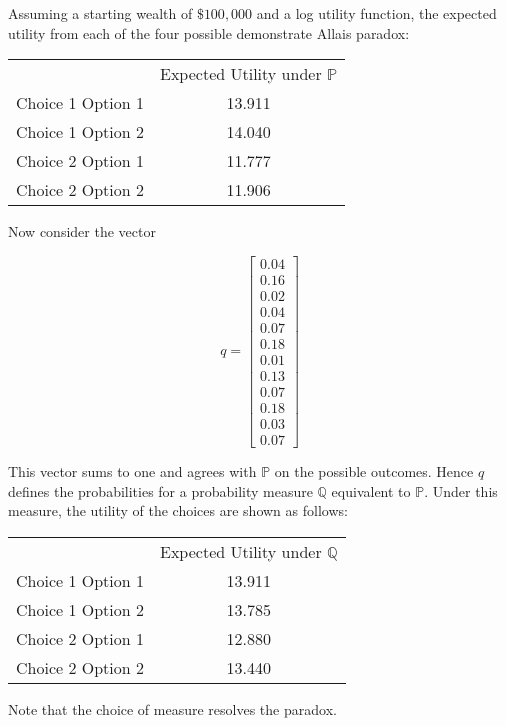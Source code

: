 \documentclass{article}
\begin{document}
Assuming a starting wealth of \(\$100,000\) and a log utility function, the expected utility from each of the four possible demonstrate Allais paradox:


\begin{center} 
	\begin{tabular}{c c}
		& Expected Utility under \(\mathbb{P}\) \\
		Choice 1 Option 1 & 13.911 \\
		Choice 1 Option 2 & 14.040 \\
		Choice 2 Option 1 & 11.777 \\
		Choice 2 Option 2 & 11.906 \\
	\end{tabular}
\end{center}

Now consider the vector 

\[q=\begin{bmatrix}
0.04 \\
0.16 \\
0.02 \\
0.04 \\
0.07 \\
0.18 \\
0.01 \\
0.13 \\ 
0.07 \\
0.18 \\
0.03 \\
0.07
\end{bmatrix}\]

This vector sums to one and agrees with \(\mathbb{P}\) on the possible outcomes.  Hence \(q\) defines the probabilities for a probability measure \(\mathbb{Q}\) equivalent to \(\mathbb{P}\).  Under this measure, the utility of the choices are shown as follows:

\begin{center} 
	\begin{tabular}{c c}
		& Expected Utility under \(\mathbb{Q}\) \\
		Choice 1 Option 1 & 13.911 \\
		Choice 1 Option 2 & 13.785 \\
		Choice 2 Option 1 & 12.880 \\
		Choice 2 Option 2 & 13.440 
	\end{tabular}
\end{center}

Note that the choice of measure resolves the paradox.  



	
\end{document}
